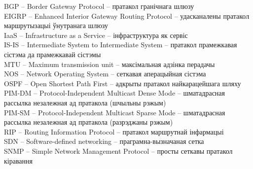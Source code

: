 \noindent
BGP -- Border Gateway Protocol -- пратакол гранічнага шлюзу \\
EIGRP -- Enhanced Interior Gateway Routing Protocol -- удасканалены пратакол маршрутызацыі ўнутранага шлюзу\\
IaaS -- Infrastructure as a Service -- інфраструктура як сервіс \\
IS-IS -- Intermediate System to Intermediate System  -- пратакол прамежкавая сістэма да прамежкавай сістэмы \\
MTU -- Maximum transmission unit -- максімальная адзінка перадачы \\
NOS -- Network Operating System -- сеткавая аперацыйная сістэма \\
OSPF -- Open Shortest Path First -- адкрыты пратакол найкарацейшага шляху \\
PIM-DM -- Protocol-Independent Multicast Dense Mode -- шматадрасная рассылка незалежная ад пратакола (шчыльны рэжым) \\
PIM-SM -- Protocol-Independent Multicast Sparse Mode -- шматадрасная рассылка незалежная ад пратакола (разрэджаны рэжым) \\
RIP -- Routing Information Protocol -- пратакол маршрутнай інфармацыі \\
SDN -- Software-defined networking -- праграмна-вызначаная сетка \\
SNMP -- Simple Network Management Protocol -- просты сеткавы пратакол кіравання
